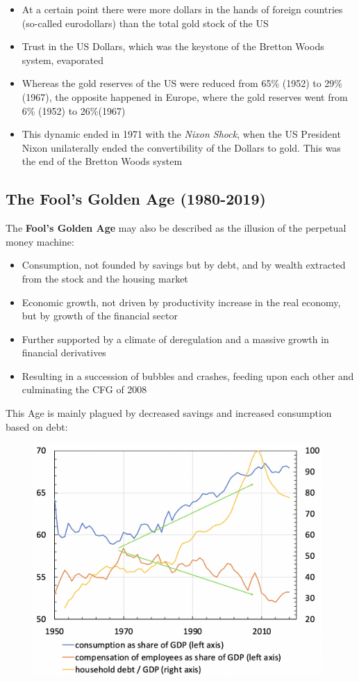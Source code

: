 \documentclass[a4paper]{extarticle}
\begin{document}
\begin{itemize}
    \item At a certain point there were more dollars in the hands of foreign countries (so-called eurodollars) than the total gold stock of the US
    \item Trust in the US Dollars, which was the keystone of the Bretton Woods system, evaporated
    \item Whereas the gold reserves of the US were reduced from 65\% (1952) to 29\% (1967), the opposite happened in Europe, where the gold reserves went from 6\% (1952) to 26\%(1967)
    \item This dynamic ended in 1971 with the \textit{Nixon Shock}, when the US President Nixon unilaterally ended the convertibility of the Dollars to gold. This was the end of the Bretton Woods system
\end{itemize}

\subsection{The Fool's Golden Age (1980-2019)}

The \textbf{Fool's Golden Age} may also be described as the illusion of the perpetual money machine:

\begin{itemize}
    \item Consumption, not founded by savings but by debt, and by wealth extracted from the stock and the housing market
    \item Economic growth, not driven by productivity increase in the real economy, but by growth of the financial sector
    \item Further supported by a climate of deregulation and a massive growth in financial derivatives
    \item Resulting in a succession of bubbles and crashes, feeding upon each other and culminating the CFG of 2008
\end{itemize}

This Age is mainly plagued by decreased savings and increased consumption based on debt:

\begin{figure}[H]
    \includegraphics[width=11cm]{../images/EnpRisk_Fig9-1}
    \centering
\end{figure}
\end{document}
